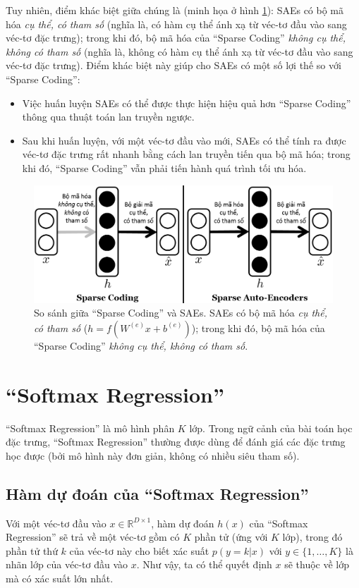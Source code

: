 Tuy nhiên, điểm khác biệt giữa chúng là (minh họa ở hình \ref{fig_SCvsSAE}): SAEs có bộ mã hóa \emph{cụ thể, có tham số} (nghĩa là, có hàm cụ thể ánh xạ từ véc-tơ đầu vào sang véc-tơ đặc trưng); trong khi đó, bộ mã hóa của ``Sparse Coding'' \emph{không cụ thể, không có tham số} (nghĩa là, không có hàm cụ thể ánh xạ từ véc-tơ đầu vào sang véc-tơ đặc trưng). Điểm khác biệt này giúp cho SAEs có một số lợi thế so với ``Sparse Coding'':
\begin{itemize}
	\item Việc huấn luyện SAEs có thể được thực hiện hiệu quả hơn ``Sparse Coding'' thông qua thuật toán lan truyền ngược.
	\item Sau khi huấn luyện, với một véc-tơ đầu vào mới, SAEs có thể tính ra được véc-tơ đặc trưng rất nhanh bằng cách lan truyền tiến qua bộ mã hóa; trong khi đó, ``Sparse Coding'' vẫn phải tiến hành quá trình tối ưu hóa.
\end{itemize}

\begin{figure}
	\centering
	\includegraphics[width=\textwidth]{SCvsSAE}
	\caption[So sánh giữa ``Sparse Coding'' và SAEs]{So sánh giữa ``Sparse Coding'' và SAEs. SAEs có bộ mã hóa \emph{cụ thể, có tham số} ($h = f(W^{(e)}x + b^{(e)})$); trong khi đó, bộ mã hóa của ``Sparse Coding'' \emph{không cụ thể, không có tham số}.}
	\label{fig_SCvsSAE}
\end{figure}

\section{``Softmax Regression''}
``Softmax Regression'' là mô hình phân $K$ lớp. Trong ngữ cảnh của bài toán học đặc trưng, ``Softmax Regression'' thường được dùng để đánh giá các đặc trưng học được (bởi mô hình này đơn giản, không có nhiều siêu tham số).
\subsection{Hàm dự đoán của ``Softmax Regression''}
Với một véc-tơ đầu vào $x \in \mathbb{R}^{D \times 1}$, hàm dự đoán $h(x)$ của ``Softmax Regression'' sẽ trả về một véc-tơ gồm có $K$ phần tử (ứng với $K$ lớp), trong đó phần tử thứ $k$ của véc-tơ này cho biết xác suất $p(y=k|x)$ với $y \in \{1,\ldots,K\}$ là nhãn lớp của véc-tơ đầu vào $x$. Như vậy, ta có thể quyết định $x$ sẽ thuộc về lớp mà có xác suất lớn nhất.

